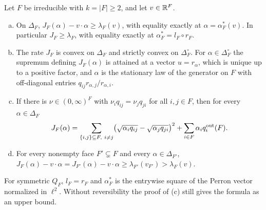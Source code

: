 \begin{proposition}\label{prop:rate}
Let $F$ be irreducible with $k=\lvert F\rvert\ge2$, and let $v\in\mathbb{R}^F$.
\begin{enumerate}[(a)]
\item On $\Delta_F$, $J_F(\alpha)-v\cdot\alpha\ge\lambda_F(v)$, with equality exactly at
$\alpha=\alpha^*_F(v)$. In particular $J_F\ge\lambda_F$, with equality exactly at
$\alpha^*_F=l_F\circ r_F$.
\item The rate $J_F$ is convex on $\Delta_F$ and strictly convex on $\Delta_F^\circ$. For
$\alpha\in\Delta_F^\circ$ the supremum defining $J_F(\alpha)$ is attained at a
vector $u=r_\alpha$, which is unique up to a positive factor, and $\alpha$ is
the stationary law of the generator on $F$ with off-diagonal entries
$q_{ij}r_{\alpha,j}/r_{\alpha,i}$.
\item If there is $\nu\in(0,\infty)^F$ with $\nu_iq_{ij}=\nu_jq_{ji}$ for all
$i,j\in F$, then for every $\alpha\in\Delta_F$
\[
 J_F(\alpha)=\sum_{\{i,j\}\subseteq F,\ i\ne j}\bigl(\sqrt{\alpha_iq_{ij}}-\sqrt{\alpha_jq_{ji}}\bigr)^2
 +\sum_{i\in F}\alpha_iq_i^{\rm out}(F).
\]
\item For every nonempty face $F'\subsetneq F$ and every
$\alpha\in\Delta_{F'}$, $J_F(\alpha)-v\cdot\alpha=J_{F'}(\alpha)-v\cdot\alpha\ge\lambda_{F'}(v_{F'})>\lambda_F(v)$.
\end{enumerate}
\end{proposition}

For symmetric $Q_F$, $l_F=r_F$ and $\alpha^*_F$ is the entrywise square of the
Perron vector normalized in $\ell^2$. Without reversibility the proof of (c)
still gives the formula as an upper bound.

